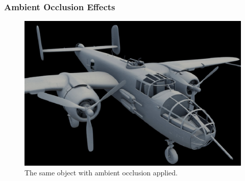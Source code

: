 \documentclass{beamer}
\begin{document}
\begin{frame}
\frametitle{Ambient Occlusion Effects}
\begin{figure}
    \centering
    \includegraphics[width=0.8\linewidth]{images/B-25_ao.png}
    \caption{The same object with ambient occlusion applied.}
\end{figure}

\end{frame}
\end{document}
